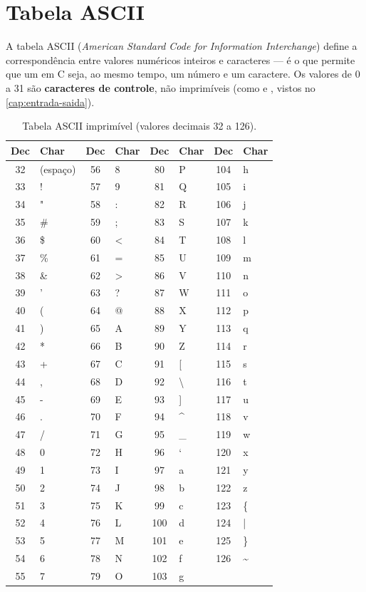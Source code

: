 \chapter{Tabela ASCII}
\label{ap:ascii}

A tabela ASCII (\emph{American Standard Code for Information Interchange}) define a correspondência entre valores numéricos inteiros e caracteres — é o que permite que um  em C seja, ao mesmo tempo, um número e um caractere. Os valores de 0 a 31 são \textbf{caracteres de controle}, não imprimíveis (como  e , vistos no \cref{cap:entrada-saida}).

\begin{table}[h]
\centering
\begin{tabular}{@{}cl@{\hspace{1cm}}cl@{\hspace{1cm}}cl@{\hspace{1cm}}cl@{}}
\toprule
\textbf{Dec} & \textbf{Char} & \textbf{Dec} & \textbf{Char} & \textbf{Dec} & \textbf{Char} & \textbf{Dec} & \textbf{Char} \\
\midrule
32 & (espaço) & 56 & 8 & 80 & P & 104 & h \\
33 & !  & 57 & 9 & 81 & Q & 105 & i \\
34 & "  & 58 & : & 82 & R & 106 & j \\
35 & \#  & 59 & ; & 83 & S & 107 & k \\
36 & \$  & 60 & < & 84 & T & 108 & l \\
37 & \%  & 61 & = & 85 & U & 109 & m \\
38 & \&  & 62 & > & 86 & V & 110 & n \\
39 & '  & 63 & ? & 87 & W & 111 & o \\
40 & (  & 64 & @ & 88 & X & 112 & p \\
41 & )  & 65 & A & 89 & Y & 113 & q \\
42 & *  & 66 & B & 90 & Z & 114 & r \\
43 & +  & 67 & C & 91 & [ & 115 & s \\
44 & ,  & 68 & D & 92 & \textbackslash & 116 & t \\
45 & -  & 69 & E & 93 & ] & 117 & u \\
46 & .  & 70 & F & 94 & \textasciicircum & 118 & v \\
47 & /  & 71 & G & 95 & \_ & 119 & w \\
48 & 0  & 72 & H & 96 & ` & 120 & x \\
49 & 1  & 73 & I & 97 & a & 121 & y \\
50 & 2  & 74 & J & 98 & b & 122 & z \\
51 & 3  & 75 & K & 99 & c & 123 & \{ \\
52 & 4  & 76 & L & 100 & d & 124 & | \\
53 & 5  & 77 & M & 101 & e & 125 & \} \\
54 & 6  & 78 & N & 102 & f & 126 & \textasciitilde \\
55 & 7  & 79 & O & 103 & g & & \\
\bottomrule
\end{tabular}
\caption{Tabela ASCII imprimível (valores decimais 32 a 126).}
\end{table}

